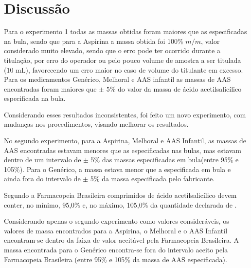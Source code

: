 \chapter{Discussão}

Para o experimento 1 todas as massas obtidas foram maiores que as especificadas na bula, sendo que
para a Aspirina\R \; a massa obtida foi 100\% $m/m$, valor considerado muito elevado, sendo que o
erro pode ter ocorrido durante a titulação, por erro do operador ou pelo pouco volume de amostra a
ser titulada (10 mL), favorecendo um erro maior no caso de volume do titulante em excesso. Para os
medicamentos Genérico, Melhoral e AAS infantil as massas de AAS encontradas foram maiores que $\pm$
5\% do valor da massa de ácido acetilsalicílico especificada na bula.

Considerando esses resultados inconsistentes, foi feito um novo experimento, com mudanças nos
procedimentos, visando melhorar os resultados.

 No segundo experimento, para a Aspirina\R, Melhoral e AAS Infantil, as massas de AAS encontradas
 estavam menores que as especificadas nas bulas, mas estavam dentro de um intervalo de $\pm$ 5\% das
 massas especificadas em bula(entre 95\% e 105\%). Para o Genérico, a massa estava menor que a
 especificada em bula e ainda fora do intervalo de $\pm$ 5\% da massa especificada pelo fabricante.

 Segundo a Farmacopeia Brasileira \cite{Farmacopeia2010} comprimidos de ácido acetilsalicílico devem
 conter, no mínimo, 95,0\% e, no máximo, 105,0\% da quantidade declarada de .

 Considerando apenas o segundo experimento como valores consideráveis, os valores de massa
 encontrados para a Aspirina\R, o Melhoral e o AAS Infantil encontram-se dentro da faixa de valor
 aceitável pela Farmacopeia Brasileira. A massa encontrada para o Genérico encontra-se fora do
 intervalo aceito pela Farmacopeia Brasileira (entre 95\% e 105\% da massa de AAS especificada).

